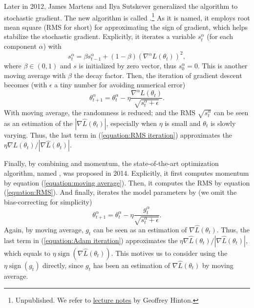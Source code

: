 \documentclass[superscriptaddress,twocolumn,aps,prd,10pt,nofootinbib,preprintnumbers]{revtex4-2}
\newcommand{\tmop}[1]{\ensuremath{\operatorname{#1}}}
\newcommand{\tmverbatim}[1]{\text{{\ttfamily{#1}}}}
\begin{document}
Later in 2012, James Martens and Ilya Sutskever generalized the
\tmverbatim{rprop} algorithm to stochastic gradient. The new algorithm is
called \tmverbatim{rmsprop}.\footnote{Unpublished. We refer to
\href{https://www.cs.toronto.edu/~tijmen/csc321/slides/lecture\_slides\_lec6.pdf}{lecture
notes} by Geoffrey Hinton.} As it is named, it employs root mean square (RMS
for short) for approximating the sign of gradient, which helps stabilize the
stochastic gradient. Explicitly, it iterates a variable $s^{\alpha}_t$ (for
each component $\alpha$) with
\begin{equation}
  s_t^{\alpha} = \beta s_{t - 1}^{\alpha} + (1 - \beta)  (\nabla^{\alpha} L
  (\theta_t))^2, \label{equation:RMS}
\end{equation}
where $\beta \in (0, 1)$ and $s$ is initialized by zero vector, thus
$s_0^{\alpha} = 0$. This is another moving average with $\beta$ the decay
factor. Then, the iteration of gradient descent becomes (with $\epsilon$ a
tiny number for avoiding numerical error)
\begin{equation}
  \theta_{t + 1}^{\alpha} = \theta_t^{\alpha} - \eta \frac{\nabla^{\alpha} L
  (\theta_t)}{\sqrt{s^{\alpha}_t + \epsilon}} . \label{equation:RMS iteration}
\end{equation}
With moving average, the randomness is reduced; and the RMS
$\sqrt{s_t^{\alpha}}$ can be seen as an estimation of the $| \nabla \hat{L}
(\theta_t) |$, especially when $\eta$ is small and $\theta_t$ is slowly
varying. Thus, the last term in (\ref{equation:RMS iteration}) approximates
the $\eta \nabla L (\theta_t) / | \nabla \hat{L} (\theta_t) |$.

Finally, by combining \tmverbatim{rmsprop} and momentum, the state-of-the-art
optimization algorithm, named \tmverbatim{adam}, was proposed in
2014.\cite{adam} Explicitly, it first
computes momentum by equation (\ref{equation:moving average}). Then, it
computes the RMS by equation (\ref{equation:RMS}). And finally, iterates the
model parameters by (we omit the bias-correcting for simplicity)
\begin{equation}
  \theta^{\alpha}_{t + 1} = \theta^{\alpha}_t - \eta
  \frac{g_t^{\alpha}}{\sqrt{s^{\alpha}_t + \epsilon}} . \label{equation:Adam
  iteration}
\end{equation}
Again, by moving average, $g_t$ can be seen as an estimation of $\nabla
\hat{L} (\theta_t)$. Thus, the last term in (\ref{equation:Adam iteration})
approximates the $\eta \nabla \hat{L} (\theta_t) / | \nabla \hat{L} (\theta_t)
|$, which equals to $\eta \tmop{sign} (\nabla \hat{L} (\theta_t))$. This
motives us to consider using the $\eta \tmop{sign} (g_t)$ directly, since
$g_t$ has been an estimation of $\nabla \hat{L} (\theta_t)$ by moving average.
\end{document}
